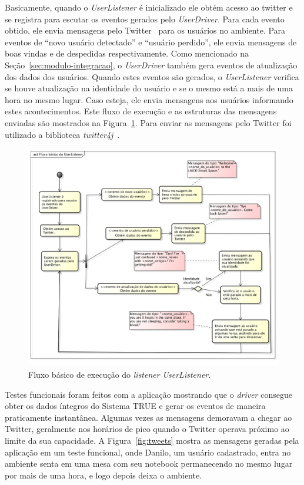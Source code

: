 	Basicamente, quando o \textit{UserListener} é inicializado ele obtém acesso ao twitter e se registra para escutar os eventos gerados pelo \textit{UserDriver}. Para cada evento obtido, ele envia mensagens pelo Twitter~\cite{twitter} para os usuários no ambiente. Para eventos de ``novo usuário detectado'' e ``usuário perdido'', ele envia mensagens de boas vindas e de despedidas respectivamente. Como mencionado na Seção~\ref{sec:modulo-integracao}, o \textit{UserDriver} também gera eventos de atualização dos dados dos usuários. Quando estes eventos são gerados, o \textit{UserListener} verifica se houve atualização na identidade do usuário e se o mesmo está a mais de uma hora no mesmo lugar. Caso esteja, ele envia mensagens aos usuários informando estes acontecimentos. Este fluxo de execução e as estruturas das mensagens enviadas são mostrados na Figura~\ref{fig:diagrama-tweet}. Para enviar as mensagens pelo Twitter foi utilizado a biblioteca \textit{twitter4j}~\cite{twitter4j}.

	\begin{figure}[hbt]
		\begin{center}
			\includegraphics[scale=0.45]{figuras/5.Testes/diagrama-user-tweet.png}
		\end{center}
		\caption{Fluxo básico de execução do \textit{listener} \textit{UserListener}.}
		\label{fig:diagrama-tweet}
	\end{figure}

	Testes funcionais foram feitos com a aplicação mostrando que o \textit{driver} consegue
	obter os dados íntegros do Sistema TRUE e gerar os eventos de maneira praticamente
	instantânea. Algumas vezes as mensagens demoravam a chegar ao Twitter,
	geralmente nos horários de pico quando o Twitter operava próximo ao limite
	da sua capacidade. A Figura~\ref{fig:tweets} mostra as mensagens geradas
	pela aplicação em um teste funcional, onde Danilo, um usuário cadastrado,
	entra no ambiente senta em uma mesa com seu notebook permanecendo no mesmo
	lugar por mais de uma hora, e logo depois deixa o ambiente.

